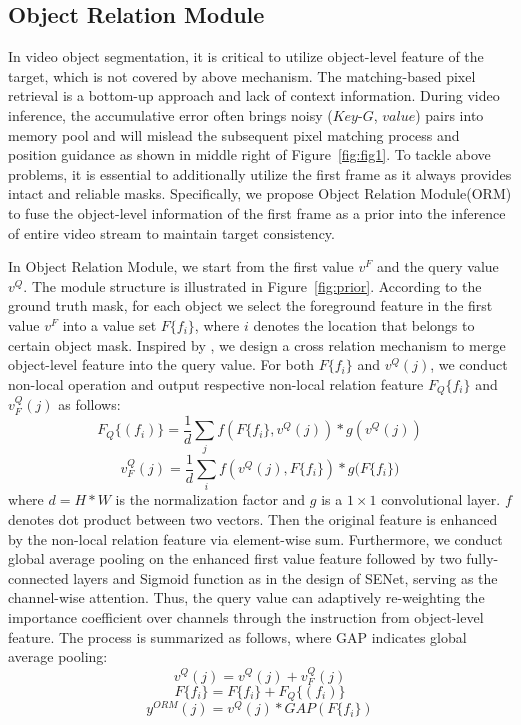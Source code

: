 \documentclass[final]{cvpr}
\begin{document}
\subsection{Object Relation Module}\label{sec:PRM}
In video object segmentation, it is critical to utilize object-level feature of the target, which is not covered by above mechanism. The matching-based pixel retrieval is a bottom-up approach and lack of context information. During video inference, the accumulative error often brings noisy ($Key$-$G$, $value$) pairs into memory pool and will mislead the subsequent pixel matching process and position guidance as shown in middle right of Figure~\ref{fig:fig1}. To tackle above problems, it is essential to additionally utilize the first frame as it always provides intact and reliable masks. Specifically, we propose Object Relation Module(ORM) to fuse the object-level information of the first frame as a prior into the inference of entire video stream to maintain target consistency.




In Object Relation Module, we start from the first value $v^{F}$ and the query value $v^{Q}$. The module structure is illustrated in Figure~\ref{fig:prior}. According to the ground truth mask, for each object we select the foreground feature in the first value $v^{F}$ into a value set $F\{f_{i}\}$, where $i$ denotes the location that belongs to certain object mask. Inspired by \cite{hsieh2019one}, we design a cross relation mechanism to merge object-level feature into the query value. For both $F\{f_{i}\}$ and $v^{Q}(j)$, we conduct non-local operation and output respective non-local relation feature $F_Q\{f_{i}\}$ and $v_{F}^{Q}(j)$ as follows:
\begin{equation}
F_Q\{(f_{i})\}=\frac{1}{d}\sum_{j}{f(F\{f_{i}\},v^{Q}(j)){\ast}g(v^{Q}(j))}
\end{equation}
\begin{equation}
v_{F}^{Q}(j)=\frac{1}{d}\sum_{i}{f(v^{Q}(j),F\{f_{i}\}){\ast}g(F\{f_{i}\}})
\end{equation}
where $d=H{\ast}W$ is the normalization factor and $g$ is a $1{\times}1$ convolutional layer. $f$ denotes dot product between two vectors. Then the original feature is enhanced by the non-local relation feature via element-wise sum.
Furthermore, we conduct global average pooling on the enhanced first value feature followed by two fully-connected layers and Sigmoid function as in the design of SENet\cite{senet}, serving as the channel-wise attention. Thus, the query value can adaptively re-weighting the importance coefficient over channels through the instruction from object-level feature. The process is summarized as follows, where GAP indicates global average pooling:
\begin{equation}
v^{Q}(j) = v^{Q}(j)+v_{F}^{Q}(j)
\end{equation}
\begin{equation}
F\{f_{i}\} = F\{f_{i}\}+F_Q\{(f_{i})\}
\end{equation}
\begin{equation}
y^{ORM}(j) = v^{Q}(j){\ast}GAP(F\{f_{i}\})
\end{equation}
\end{document}
